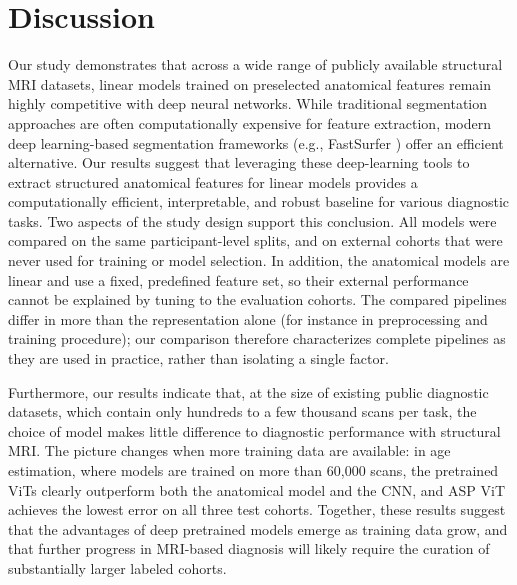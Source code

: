 \documentclass[pdflatex,sn-nature]{sn-jnl}%
\newif\ifhighlight
\newcommand{\rev}[1]{\ifhighlight{\color{blue}{}#1}\else#1\fi}%
\newcommand{\revdel}[1]{\ifhighlight{\color{red}\sout{#1}}\fi}
\theoremstyle{thmstyleone}%
\theoremstyle{thmstyletwo}%
\theoremstyle{thmstylethree}%
\begin{document}





\section*{Discussion}\label{discussion}

Our study demonstrates that across a wide range of publicly available structural MRI datasets, linear models trained on preselected anatomical features remain highly competitive with deep neural networks. While traditional segmentation approaches are often computationally expensive for feature extraction, modern deep learning-based segmentation frameworks (e.g., FastSurfer \citep{henschel2020fastsurfer}) offer an efficient alternative. Our results suggest that leveraging these deep-learning tools to extract structured anatomical features for linear models provides a computationally efficient, interpretable, and robust baseline for various diagnostic tasks. \rev{Two aspects of the study design support this conclusion. All models were compared on the same participant-level splits, and on external cohorts that were never used for training or model selection. In addition, the anatomical models are linear and use a fixed, predefined feature set, so their external performance cannot be explained by tuning to the evaluation cohorts. The compared pipelines differ in more than the representation alone (for instance in preprocessing and training procedure); our comparison therefore characterizes complete pipelines as they are used in practice, rather than isolating a single factor.}

\revdel{Furthermore, our results indicate that diagnostic performance using structural MRI may have reached a saturation point within existing public datasets that contain only hundreds to a few thousand scans. Further progress will likely require the curation of substantially larger cohorts. Our age-estimation experiments on a cohort of 60,000 subjects indicate that scaling public datasets could unlock further methodological innovation.} \rev{Furthermore, our results indicate that, at the size of existing public diagnostic datasets, which contain only hundreds to a few thousand scans per task, the choice of model makes little difference to diagnostic performance with structural MRI. The picture changes when more training data are available: in age estimation, where models are trained on more than 60,000 scans, the pretrained ViTs clearly outperform both the anatomical model and the CNN, and ASP ViT achieves the lowest error on all three test cohorts. Together, these results suggest that the advantages of deep pretrained models emerge as training data grow, and that further progress in MRI-based diagnosis will likely require the curation of substantially larger labeled cohorts.}
\end{document}
